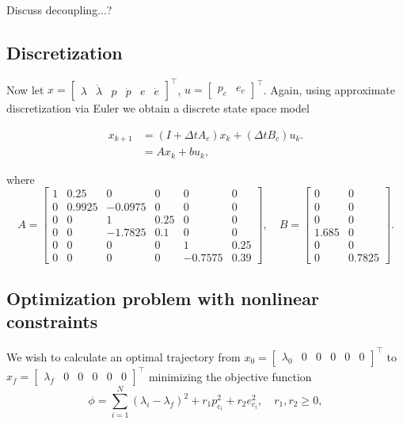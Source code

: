 Discuss decoupling...?

\subsection{Discretization}
Now let $x = \begin{bmatrix}\lambda&\dot{\lambda}&p&\dot{p}&e&\dot{e}\end{bmatrix}^\top$, $u = \begin{bmatrix}p_c&e_c\end{bmatrix}^\top$. Again, using approximate discretization via Euler we obtain a discrete state space model

\begin{subequations}
\begin{align}
	\label{eq:ex_dsys}
	x_{k+1} &= (I + \Delta t A_c) x_k + (\Delta t B_c) u_k. \\
	&= Ax_k + bu_k,
\end{align}
\end{subequations}

where 
\begin{equation*}
	A = 
	\begin{bmatrix}
		1 & 0.25 & 0 & 0 & 0 & 0\\
		0 & 0.9925 & -0.0975 & 0 & 0 & 0\\
		0 & 0 & 1 & 0.25 & 0 & 0\\
		0 & 0 & -1.7825 & 0.1 & 0 & 0\\
		0 & 0 & 0 & 0 & 1 & 0.25\\
		0 & 0 & 0 & 0 & -0.7575 & 0.39
	\end{bmatrix}, \quad
	B = 
	\begin{bmatrix}
		0 & 0\\
		0 & 0\\
		0 & 0\\
		1.685 & 0\\
		0 & 0\\
		0 & 0.7825
	\end{bmatrix}.
\end{equation*}

\subsection{Optimization problem with nonlinear constraints}

We wish to calculate an optimal trajectory from $x_0 = \begin{bmatrix}\lambda_0&0&0&0&0&0\end{bmatrix}^\top$ to $x_f = \begin{bmatrix}\lambda_f&0&0&0&0&0\end{bmatrix}^\top$ minimizing the objective function 
\begin{equation*}
	\phi = \sum_{i=1}^{N}(\lambda_i - \lambda_f)^2 + r_1 p^2_{c_i} + r_2 e^2_{c_i}, \quad r_1,r_2 \ge 0,
\end{equation*}

